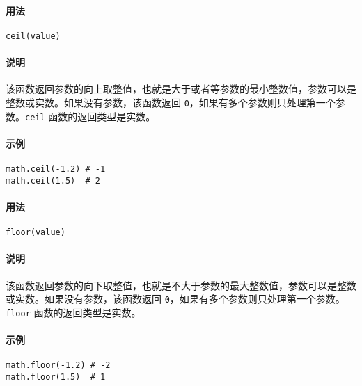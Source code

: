 
\paragraph{用法}
\begin{lstlisting}[language=berry, numbers=none]
ceil(value)
\end{lstlisting}

\paragraph{说明}
该函数返回参数的向上取整值，也就是大于或者等参数的最小整数值，参数可以是整数或实数。如果没有参数，该函数返回 \texttt{0}，如果有多个参数则只处理第一个参数。\texttt{ceil} 函数的返回类型是实数。

\paragraph{示例}
\begin{lstlisting}[language=berry, numbers=none]
math.ceil(-1.2) # -1
math.ceil(1.5)  # 2
\end{lstlisting}


\paragraph{用法}
\begin{lstlisting}[language=berry, numbers=none]
floor(value)
\end{lstlisting}

\paragraph{说明}
该函数返回参数的向下取整值，也就是不大于参数的最大整数值，参数可以是整数或实数。如果没有参数，该函数返回 \texttt{0}，如果有多个参数则只处理第一个参数。\texttt{floor} 函数的返回类型是实数。

\paragraph{示例}
\begin{lstlisting}[language=berry, numbers=none]
math.floor(-1.2) # -2
math.floor(1.5)  # 1
\end{lstlisting}


